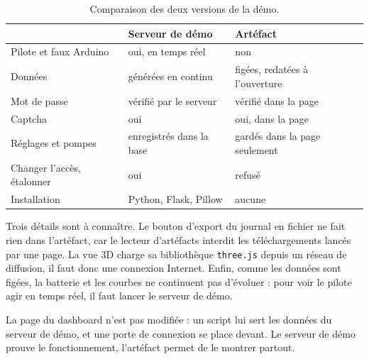 \begin{table}[H]
\centering
\small
\begin{tabularx}{\textwidth}{|l|Y|Y|}
\hline
 & \textbf{Serveur de démo} & \textbf{Artéfact} \\
\hline
Pilote et faux Arduino & oui, en temps réel & non \\
\hline
Données & générées en continu & figées, redatées à l'ouverture \\
\hline
Mot de passe & vérifié par le serveur & vérifié dans la page \\
\hline
Captcha & oui & oui, dans la page \\
\hline
Réglages et pompes & enregistrés dans la base & gardés dans la page seulement \\
\hline
Changer l'accès, étalonner & oui & refusé \\
\hline
Installation & Python, Flask, Pillow & aucune \\
\hline
\end{tabularx}
\caption{Comparaison des deux versions de la démo.}
\end{table}

Trois détails sont à connaître. Le bouton d'export du journal en fichier ne fait rien dans l'artéfact, car le lecteur d'artéfacts interdit les téléchargements lancés par une page. La vue 3D charge sa bibliothèque \texttt{three.js} depuis un réseau de diffusion, il faut donc une connexion Internet. Enfin, comme les données sont figées, la batterie et les courbes ne continuent pas d'évoluer : pour voir le pilote agir en temps réel, il faut lancer le serveur de démo.

\begin{aretenir}
La page du dashboard n'est pas modifiée : un script lui sert les données du serveur de démo, et une porte de connexion se place devant. Le serveur de démo prouve le fonctionnement, l'artéfact permet de le montrer partout.
\end{aretenir}

